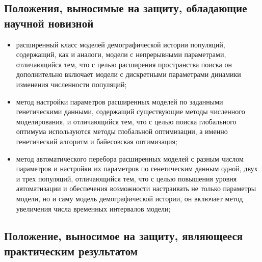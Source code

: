 \documentclass[a4paper,14pt,oneside,openany,article]{memoir}
\begin{document}
\newpage
\subsection*{Положения, выносимые на защиту, обладающие научной новизной}

\begin{itemize}
    \item расширенный класс моделей демографической истории популяций, содержащий, как и аналоги, модели с непрерывными параметрами, отличающийся тем, что с целью расширения пространства поиска он дополнительно включает модели с дискретными параметрами динамики изменения численности популяций;
    \item метод настройки параметров расширенных моделей по заданными генетическими данными, содержащий существующие методы численного моделирования, и отличающийся тем, что с целью поиска глобального оптимума используются методы глобальной оптимизации, а именно генетический алгоритм и байесовская оптимизация;
    \item метод автоматического перебора расширенных моделей с разным числом параметров и настройки их параметров по генетическим данным одной, двух и трех популяций, отличающийся тем, что с целью повышения уровня автоматизации  и обеспечения возможности настраивать не только параметры модели, но и саму модель демографической истории, он включает метод увеличения числа временных интервалов модели;
\end{itemize}

\subsection*{Положение, выносимое на защиту, являющееся практическим результатом}
\end{document}
